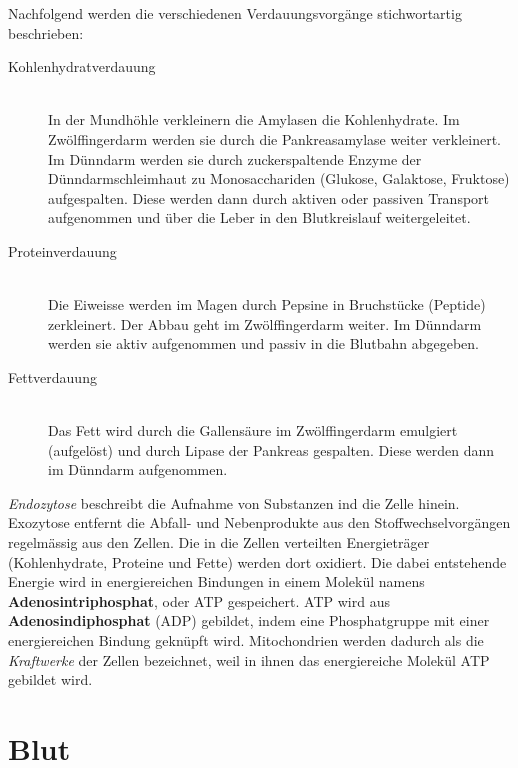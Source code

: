 Nachfolgend werden die verschiedenen Verdauungsvorgänge stichwortartig beschrieben:
\begin{description}
	\item[Kohlenhydratverdauung] \hfil  \\
	In der Mundhöhle verkleinern die Amylasen die Kohlenhydrate. Im Zwölffingerdarm werden sie durch die Pankreasamylase weiter verkleinert. Im Dünndarm werden sie durch zuckerspaltende Enzyme der Dünndarmschleimhaut zu Monosacchariden (Glukose, Galaktose, Fruktose) aufgespalten. Diese werden dann durch aktiven oder passiven Transport aufgenommen und über die Leber in den Blutkreislauf weitergeleitet.
	
	\item[Proteinverdauung] \hfil \\
	Die Eiweisse werden im Magen durch Pepsine in Bruchstücke (Peptide) zerkleinert. Der Abbau geht im Zwölffingerdarm weiter. Im Dünndarm werden sie aktiv aufgenommen und passiv in die Blutbahn abgegeben.
	
	\item[Fettverdauung] \hfil \\
	Das Fett wird durch die Gallensäure im Zwölffingerdarm emulgiert (aufgelöst) und durch Lipase der Pankreas gespalten. Diese werden dann im Dünndarm aufgenommen.
\end{description}
\textit{Endozytose} beschreibt die Aufnahme von Substanzen ind die Zelle hinein. Exozytose entfernt die Abfall- und Nebenprodukte aus den Stoffwechselvorgängen regelmässig aus den Zellen. Die in die Zellen verteilten Energieträger (Kohlenhydrate, Proteine und Fette) werden dort oxidiert. Die dabei entstehende Energie wird in energiereichen Bindungen in einem Molekül namens \textbf{Adenosintriphosphat}, oder ATP gespeichert. ATP wird aus \textbf{Adenosindiphosphat} (ADP) gebildet, indem eine Phosphatgruppe mit einer energiereichen Bindung geknüpft wird. Mitochondrien werden dadurch als die \textit{Kraftwerke} der Zellen bezeichnet, weil in ihnen das energiereiche Molekül ATP gebildet wird.

\section{Blut}

